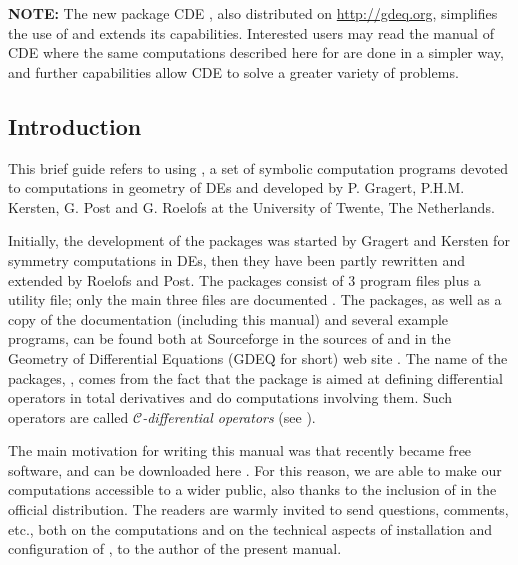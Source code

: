   \textbf{NOTE:} The new \REDUCE package CDE \cite{Vitolo:CDE}, also distributed on
  \url{http://gdeq.org}, simplifies the use of \cdiff and extends its
  capabilities. Interested users may read the manual of CDE where the same
  computations described here for \cdiff are done in a simpler way, and further
  capabilities allow CDE to solve a greater variety of problems.


\subsection{Introduction}

This brief guide refers to using \cdiff, a set of symbolic computation programs
devoted to computations in geometry of DEs and developed by P. Gragert,
P.H.M. Kersten, G. Post and G. Roelofs at the University of Twente, The
Netherlands.

Initially, the development of the \cdiff packages was started by Gragert and
Kersten for symmetry computations in DEs, then they have been partly rewritten
and extended by Roelofs and Post. The \cdiff packages consist of 3 program
files plus a utility file; only the main three files are documented
\cite{Roelofs:92,Roelofs:92a,Post:96}. The \cdiff packages, as well as a copy of the
documentation (including this manual) and several example programs, can be
found both at Sourceforge in the sources of \REDUCE \cite{Reduce:Obtaining} and in the
Geometry of Differential Equations (GDEQ for short) web site \cite{gdeq}. The
name of the packages, \cdiff, comes from the fact that the package is aimed at
defining differential operators in total derivatives and do computations
involving them.  Such operators are called \emph{$\mathcal{C}$-differential
  operators} (see \cite{Krasilshchik:99}).

The main motivation for writing this manual was that  recently became
free software, and can be downloaded here \cite{Reduce:Obtaining}. For this reason, we are
able to make our computations accessible to a wider public, also thanks to the
inclusion of \cdiff in the official \REDUCE distribution. The readers are
warmly invited to send questions, comments, etc., both on the computations and
on the technical aspects of installation and configuration of \REDUCE, to the
author of the present manual.

